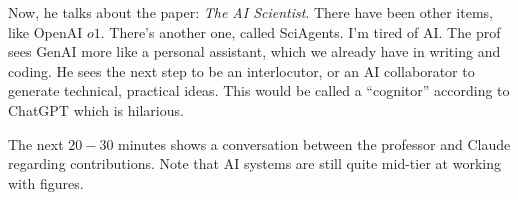 \documentclass[10pt, oneside]{article}
\begin{document}
Now, he talks about the paper: \textit{The AI Scientist}. There have been other items, like OpenAI $o1$. There's another one, called SciAgents. I'm tired of AI. The prof sees GenAI more like a personal assistant, which we already have in writing and coding. He sees the next step to be an interlocutor, or an AI collaborator to generate technical, practical ideas. This would be called a ``cognitor'' according to ChatGPT which is hilarious. 

The next $20-30$ minutes shows a conversation between the professor and Claude regarding contributions. Note that AI systems are still quite mid-tier at working with figures. 
\end{document}
